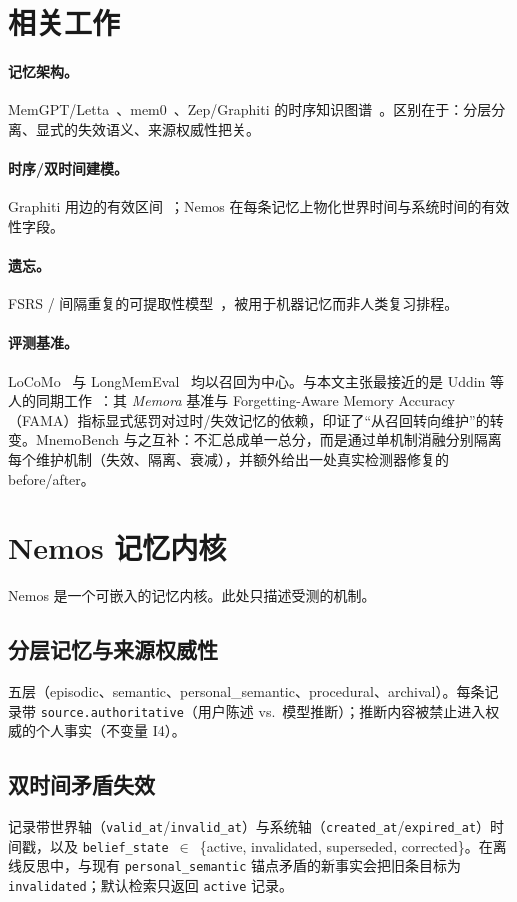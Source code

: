 \documentclass[11pt,fontset=fandol]{ctexart}
\begin{document}
\section{相关工作}
\label{sec:related}
\paragraph{记忆架构。}MemGPT/Letta~\cite{memgpt}、mem0~\cite{mem0}、Zep/Graphiti 的时序知识图谱~\cite{zep,graphiti}。区别在于：分层分离、显式的失效语义、来源权威性把关。
\paragraph{时序/双时间建模。}Graphiti 用边的有效区间~\cite{graphiti}；Nemos 在每条记忆上物化世界时间与系统时间的有效性字段。
\paragraph{遗忘。}FSRS / 间隔重复的可提取性模型~\cite{ssp,fsrs}，被用于机器记忆而非人类复习排程。
\paragraph{评测基准。}LoCoMo~\cite{locomo} 与 LongMemEval~\cite{longmemeval} 均以召回为中心。与本文主张最接近的是 Uddin 等人的同期工作~\cite{fama}：其 \emph{Memora} 基准与 Forgetting-Aware Memory Accuracy（FAMA）指标显式惩罚对过时/失效记忆的依赖，印证了“从召回转向维护”的转变。MnemoBench 与之互补：不汇总成单一总分，而是通过单机制消融分别隔离每个维护机制（失效、隔离、衰减），并额外给出一处真实检测器修复的 before/after。

\section{Nemos 记忆内核}
\label{sec:system}
Nemos 是一个可嵌入的记忆内核。此处只描述受测的机制。
\subsection{分层记忆与来源权威性}
五层（episodic、semantic、personal\_\allowbreak semantic、procedural、archival）。每条记录带 \texttt{source.\allowbreak authoritative}（用户陈述 vs.\ 模型推断）；推断内容被禁止进入权威的个人事实（不变量 I4）。
\subsection{双时间矛盾失效}
记录带世界轴（\texttt{valid\_\allowbreak at}/\texttt{invalid\_\allowbreak at}）与系统轴（\texttt{created\_\allowbreak at}/\texttt{expired\_\allowbreak at}）时间戳，以及 \texttt{belief\_\allowbreak state}~$\in$~\{active, invalidated, superseded, corrected\}。在离线反思中，与现有 \texttt{personal\_\allowbreak semantic} 锚点矛盾的新事实会把旧条目标为 \texttt{invalidated}；默认检索只返回 \texttt{active} 记录。
\end{document}
